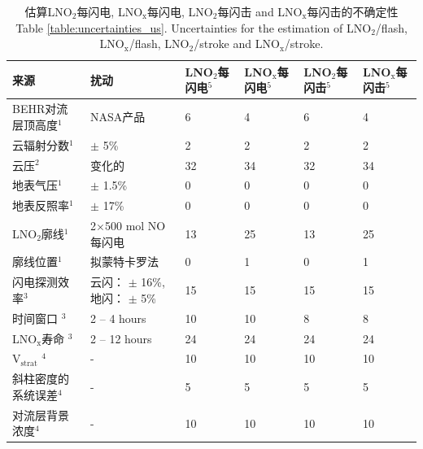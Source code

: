 \begin{table}[t]
\centering
\scriptsize
\caption{估算LNO$_\textrm{2}$每闪电, LNO$_\textrm{x}$每闪电, LNO$_\textrm{2}$每闪击 and LNO$_\textrm{x}$每闪击的不确定性\\ Table \ref{table:uncertainties_us}. Uncertainties for the estimation of LNO$_\textrm{2}$/flash, LNO$_\textrm{x}$/flash, LNO$_\textrm{2}$/stroke and LNO$_\textrm{x}$/stroke.}
\begin{tabular}{llllll}
\hline
\textbf{来源} & \textbf{扰动} & \textbf{LNO$_\textrm{2}$每闪电$^5$} & \textbf{LNO$_\textrm{x}$每闪电$^5$} & \textbf{LNO$_\textrm{2}$每闪击$^5$} & \textbf{LNO$_\textrm{x}$每闪击$^5$} \\
\hline
BEHR对流层顶高度$^1$                    & NASA产品                              & 6   & 4   & 6   & 4 \\
云辐射分数$^1$                          & $\pm$ 5\%                            & 2   & 2   & 2   & 2 \\
云压$^2$                               & 变化的                                & 32  & 34  & 32  & 34 \\
地表气压$^1$                            & $\pm$ 1.5\%                          & 0   & 0   & 0   & 0 \\
地表反照率$^1$                          & $\pm$ 17\%                           & 0   & 0   & 0   & 0 \\
LNO$_\textrm{2}$廓线$^1$               & 2$\times$500 mol NO每闪电             & 13  & 25  & 13  & 25 \\
廓线位置$^1$                            & 拟蒙特卡罗法                           & 0   & 1   & 0   & 1 \\
闪电探测效率$^3$                        & 云闪： $\pm$ 16\%, 地闪： $\pm$ 5\%        & 15  & 15  & 15  & 15 \\
时间窗口%
$^3$                                  & 2 -- 4 hours                         & 10  & 10  & 8   & 8 \\
LNO$_\textrm{x}$寿命%
$^3$                                  & 2 -- 12 hours                        & 24  & 24  & 24  & 24 \\
V$_\textrm{strat}$%
$^4$                                  & -                                    & 10  & 10  & 10  & 10 \\
斜柱密度的系统误差$^4$                   & -                                    & 5   & 5   & 5   & 5 \\
对流层背景浓度$^4$           & -                                    & 10  & 10  & 10  & 10  \\

\end{tabular}
\end{table}
